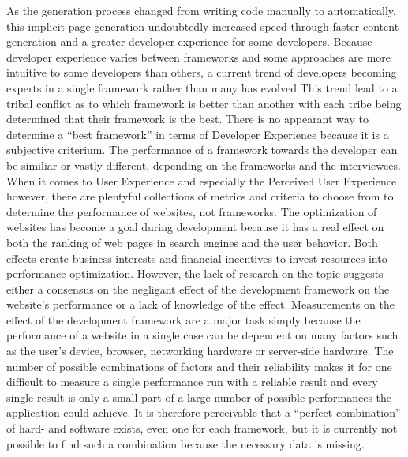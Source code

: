 \documentclass[a4paper, fontsize=11pt]{article}
\begin{document}
As the generation process changed from writing code manually to automatically, this implicit page generation undoubtedly increased speed through faster content generation and a greater developer experience for some developers.
Because developer experience varies between frameworks and some approaches are more intuitive to some developers than others, a current trend of developers becoming experts in a single framework rather than many has evolved 
This trend lead to a tribal conflict as to which framework is better than another with each tribe being determined that their framework is the best.
There is no appearant way to determine a \enquote{best framework} in terms of Developer Experience because it is a subjective criterium.
The performance of a framework towards the developer can be similiar or vastly different, depending on the frameworks and the interviewees.
When it comes to User Experience and especially the Perceived User Experience however, there are plentyful collections of metrics and criteria to choose from to determine the performance of websites, not frameworks.
The optimization of websites has become a goal during development because it has a real effect on both the ranking of web pages in search engines and the user behavior.
Both effects create business interests and financial incentives to invest resources into performance optimization.
However, the lack of research on the topic suggests either a consensus on the negligant effect of the development framework on the website's performance or a lack of knowledge of the effect.
Measurements on the effect of the development framework are a major task simply because the performance of a website in a single case can be dependent on many factors such as the user's device, browser, networking hardware or server-side hardware.
The number of possible combinations of factors and their reliability makes it for one difficult to measure a single performance run with a reliable result and every single result is only a small part of a large number of possible performances the application could achieve.
It is therefore perceivable that a \enquote{perfect combination} of hard- and software exists, even one for each framework, but it is currently not possible to find such a combination because the necessary data is missing.
\end{document}
